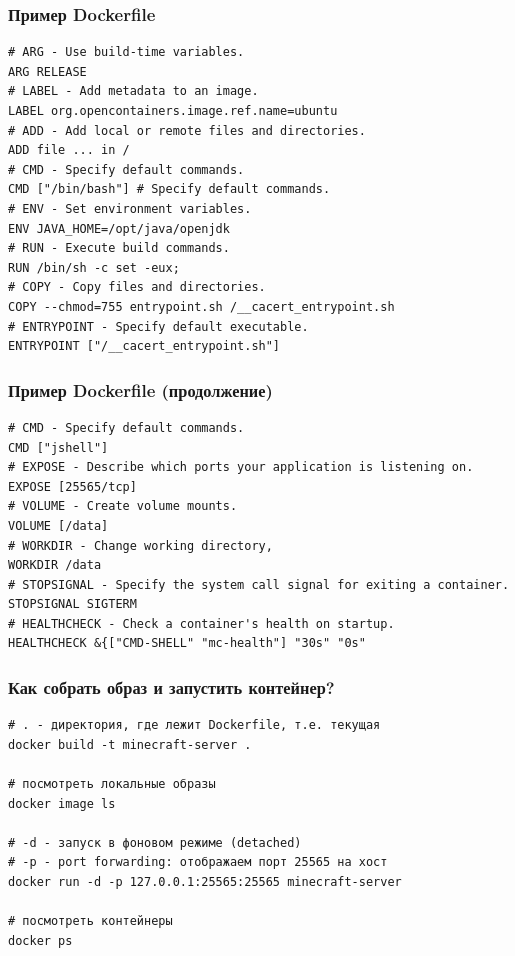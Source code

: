 \documentclass{beamer}
\begin{document}
\begin{frame}[fragile]
\frametitle{Пример Dockerfile}

\begin{verbatim}
# ARG - Use build-time variables.
ARG RELEASE
# LABEL - Add metadata to an image.
LABEL org.opencontainers.image.ref.name=ubuntu
# ADD - Add local or remote files and directories.
ADD file ... in /
# CMD - Specify default commands.
CMD ["/bin/bash"] # Specify default commands.
# ENV - Set environment variables.
ENV JAVA_HOME=/opt/java/openjdk
# RUN - Execute build commands.
RUN /bin/sh -c set -eux;
# COPY - Copy files and directories.
COPY --chmod=755 entrypoint.sh /__cacert_entrypoint.sh
# ENTRYPOINT - Specify default executable.
ENTRYPOINT ["/__cacert_entrypoint.sh"]
\end{verbatim}

\end{frame}

\begin{frame}[fragile]
\frametitle{Пример Dockerfile (продолжение)}

\begin{verbatim}
# CMD - Specify default commands.
CMD ["jshell"]
# EXPOSE - Describe which ports your application is listening on.
EXPOSE [25565/tcp]
# VOLUME - Create volume mounts.
VOLUME [/data]
# WORKDIR - Change working directory,
WORKDIR /data
# STOPSIGNAL - Specify the system call signal for exiting a container.
STOPSIGNAL SIGTERM
# HEALTHCHECK - Check a container's health on startup.
HEALTHCHECK &{["CMD-SHELL" "mc-health"] "30s" "0s"
\end{verbatim}

\end{frame}

\begin{frame}[fragile]
\frametitle{Как собрать образ и запустить контейнер?}

\begin{verbatim}
# . - директория, где лежит Dockerfile, т.е. текущая
docker build -t minecraft-server .

# посмотреть локальные образы
docker image ls

# -d - запуск в фоновом режиме (detached)
# -p - port forwarding: отображаем порт 25565 на хост
docker run -d -p 127.0.0.1:25565:25565 minecraft-server

# посмотреть контейнеры
docker ps
\end{verbatim}

\end{frame}
\end{document}
